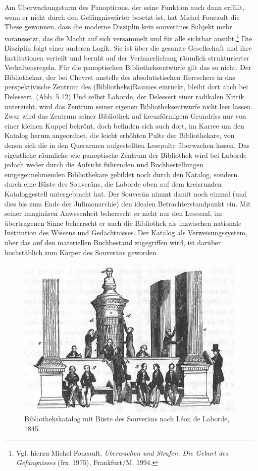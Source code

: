Am Überwachungsturm des Panopticons, der seine Funktion auch dann
erfüllt, wenn er nicht durch den Gefängniswärter besetzt ist, hat Michel
Foucault die These gewonnen, dass die moderne Disziplin kein souveränes
Subjekt mehr voraussetzt, das die Macht auf sich versammelt und für alle
sichtbar ausübt.\footnote{Vgl. hierzu Michel Foucault, \emph{Überwachen
  und Strafen. Die Geburt des Gefängnisses} (frz. 1975), Frankfurt/M.
  1994.} Die Disziplin folgt einer anderen Logik. Sie ist über die
gesamte Gesellschaft und ihre Institutionen verteilt und beruht auf der
Verinnerlichung räumlich strukturierter Verhaltensregeln. Für die
panoptischen Bibliotheksentwürfe gilt das so nicht. Der Bibliothekar,
der bei Chevret anstelle des absolutistischen Herrschers in das
perspektivische Zentrum des (Bibliotheks)Raumes einrückt, bleibt dort
auch bei Delessert. (Abb. 5.12) Und selbst Laborde, der Delessert einer
radikalen Kritik unterzieht, wird das Zentrum seiner eigenen
Bibliotheksentwürfe nicht leer lassen. Zwar wird das Zentrum seiner
Bibliothek auf kreuzförmigem Grundriss nur von einer kleinen Kuppel
bekrönt, doch befinden sich auch dort, im Karree um den Katalog herum
angeordnet, die leicht erhöhten Pulte der Bibliothekare, von denen sich
die in den Querarmen aufgestellten Lesepulte überwachen lassen. Das
eigentliche räumliche wie panoptische Zentrum der Bibliothek wird bei
Laborde jedoch weder durch die Aufsicht führenden und Buchbestellungen
entgegennehmenden Bibliothekare gebildet noch durch den Katalog, sondern
durch eine Büste des Souveräns, die Laborde oben auf dem kreisrunden
Kataloggestell untergebracht hat. Der Souverän nimmt damit noch einmal
(und dies bis zum Ende der Julimonarchie) den idealen
Betrachterstandpunkt ein. Mit seiner imaginären Anwesenheit beherrscht
er nicht nur den Lesesaal, im übertragenen Sinne beherrscht er auch die
Bibliothek als inzwischen nationale Institution des Wissens und
Gedächtnisses. Der Katalog als Verweisungssystem, über das auf den
materiellen Buchbestand zugegriffen wird, ist darüber buchstäblich zum
Körper des Souveräns geworden.

\begin{figure}[htbp]
\centering
\includegraphics{img/wagner-12.jpg}
\caption{Bibliothekskatalog mit Büste des Souveräns nach Léon
de Laborde, 1845.}
\end{figure}

